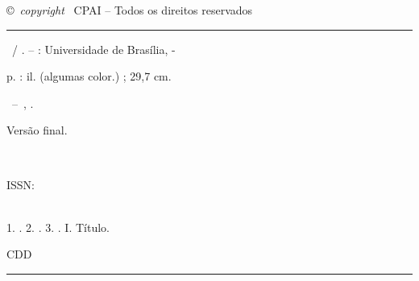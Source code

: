 %


{
\ABNTEXchapterfont\setlength{\parindent}{0cm}

\vspace*{\fill}

{\tiny \copyright\ \textit{copyright} \the\year\ CPAI -- Todos os direitos reservados}


\vspace*{\fill} %

\begin{fichacatalografica}\ABNTEXchapterfont
    \vspace*{\fill} %
    \hrule %
    \begin{center} %
        \begin{minipage}[c]{13cm} %
            \hspace{0.5cm} \ptrabtitulo\ / \ptrabautor. --
            \imprimirlocal : Universidade de Brasília, \ptrabdata-

            \hspace{0.5cm} \pageref{LastPage} p. : il. (algumas color.) ; 29,7 cm.\\

            \hspace{0.5cm}
            \parbox[t]{\textwidth}{\ptrabtipo~--~\CPAI, \ptrabdata.}

            \hspace{0.5cm}
            \parbox[t]{\textwidth}{Versão final.}\\

            \hspace{0.5cm}
            \parbox[t]{\textwidth}{ISSN: \ptrabissn}\\

            \hspace{0.5cm}
            1. \ptrabkeyworda.
            2. \ptrabkeywordb.
            3. \ptrabkeywordc.
            I. Título.

            \begin{flushright}
                 CDD \ptrabcdd
            \end{flushright}
        \end{minipage}
    \end{center}
    \hrule
\end{fichacatalografica}

\cleardoublepage
}

